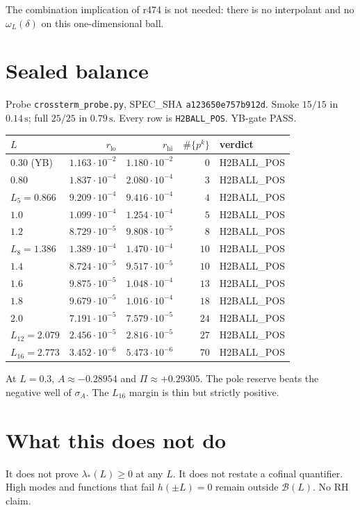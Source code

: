 \documentclass[11pt]{article}
\theoremstyle{remark}
\begin{document}
The combination implication of r474 is not needed: there is no
interpolant and no $\omega_L(\delta)$ on this one-dimensional ball.

\section{Sealed balance}\label{sec:table}

Probe \texttt{crossterm\_probe.py},
SPEC\_SHA \texttt{a123650e757b912d}.
Smoke $15/15$ in $0.14\,\mathrm{s}$; full $25/25$ in $0.79\,\mathrm{s}$.
Every row is \texttt{H2BALL\_POS}.  YB-gate PASS.

\begin{center}
\small
\begin{tabular}{@{}lrrrl@{}}
\toprule
$L$ & $r_{\mathrm{lo}}$ & $r_{\mathrm{hi}}$ & $\#\{p^k\}$ & verdict\\
\midrule
$0.30$ (YB) & $1.163\cdot10^{-2}$ & $1.180\cdot10^{-2}$ & $0$ & H2BALL\_POS\\
$0.80$ & $1.837\cdot10^{-4}$ & $2.080\cdot10^{-4}$ & $3$ & H2BALL\_POS\\
$L_5=0.866$ & $9.209\cdot10^{-4}$ & $9.416\cdot10^{-4}$ & $4$ & H2BALL\_POS\\
$1.0$ & $1.099\cdot10^{-4}$ & $1.254\cdot10^{-4}$ & $5$ & H2BALL\_POS\\
$1.2$ & $8.729\cdot10^{-5}$ & $9.808\cdot10^{-5}$ & $8$ & H2BALL\_POS\\
$L_8=1.386$ & $1.389\cdot10^{-4}$ & $1.470\cdot10^{-4}$ & $10$ & H2BALL\_POS\\
$1.4$ & $8.724\cdot10^{-5}$ & $9.517\cdot10^{-5}$ & $10$ & H2BALL\_POS\\
$1.6$ & $9.875\cdot10^{-5}$ & $1.048\cdot10^{-4}$ & $13$ & H2BALL\_POS\\
$1.8$ & $9.679\cdot10^{-5}$ & $1.016\cdot10^{-4}$ & $18$ & H2BALL\_POS\\
$2.0$ & $7.191\cdot10^{-5}$ & $7.579\cdot10^{-5}$ & $24$ & H2BALL\_POS\\
$L_{12}=2.079$ & $2.456\cdot10^{-5}$ & $2.816\cdot10^{-5}$ & $27$ & H2BALL\_POS\\
$L_{16}=2.773$ & $3.452\cdot10^{-6}$ & $5.473\cdot10^{-6}$ & $70$ & H2BALL\_POS\\
\bottomrule
\end{tabular}
\end{center}

At $L=0.3$, $A\approx-0.28954$ and $\Pi\approx+0.29305$.  The pole
reserve beats the negative well of $\sigma_A$.  The $L_{16}$
margin is thin but strictly positive.

\section{What this does not do}

It does not prove $\lambda_*(L)\ge0$ at any $L$.  It does not
restate a cofinal quantifier.  High modes and functions that fail
$h(\pm L)=0$ remain outside $\mathcal B(L)$.  No RH claim.
\end{document}

